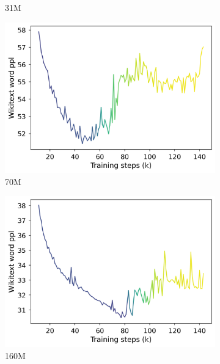 \begin{figure}[ht!]
\begin{subfigure}{0.45\columnwidth}
         \caption{31M}
         \label{fig:31M}
    \end{subfigure}
    \begin{subfigure}{0.45\columnwidth}
         \includegraphics[width=\linewidth]{sources/part_1/softmax_bottleneck/imgs/anisotropy_explosion_70m.png}
         \caption{70M}
         \label{fig:70M}
    \end{subfigure}
    \begin{subfigure}{0.45\columnwidth}
         \includegraphics[width=\linewidth]{sources/part_1/softmax_bottleneck/imgs/anisotropy_explosion_160m.png}
         \caption{160M}
         \label{fig:160M}
    \end{subfigure}
    \begin{subfigure}{0.45\columnwidth}

\end{subfigure}
\end{figure}
